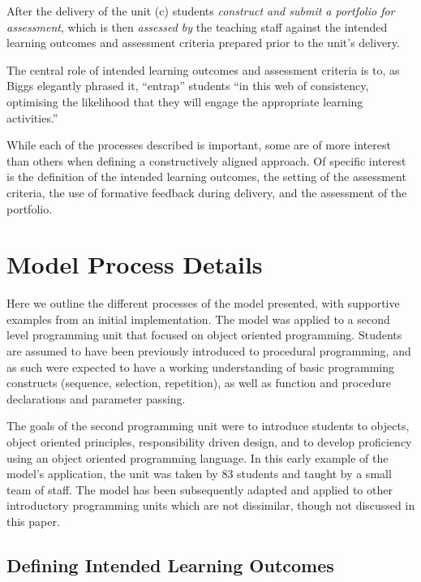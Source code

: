 After the delivery of the unit (c) students \emph{construct and submit a portfolio for assessment}, which is then \emph{assessed by} the teaching staff against the intended learning outcomes and assessment criteria prepared prior to the unit's delivery.

The central role of intended learning outcomes and assessment criteria is to, as Biggs elegantly phrased it, ``entrap'' students ``in this web of consistency, optimising the likelihood that they will engage the appropriate learning activities.''~\cite{Biggs:1999}

While each of the processes described is important, some are of more interest than others when defining a constructively aligned approach. Of specific interest is the definition of the intended learning outcomes, the setting of the assessment criteria, the use of formative feedback during delivery, and the assessment of the portfolio.

\section{Model Process Details} %
\label{sec:process_details}

Here we outline the different processes of the model presented, with supportive examples from an initial implementation. The model was applied to a second level programming unit that focused on object oriented programming. Students are assumed to have been previously introduced to procedural programming, and as such were expected to have a working understanding of basic programming constructs (sequence, selection, repetition), as well as function and procedure declarations and parameter passing. 

The goals of the second programming unit were to introduce students to objects, object oriented principles, responsibility driven design, and to develop proficiency using an object oriented programming language. In this early example of the model's application, the unit was taken by 83 students and taught by a small team of staff. The model has been subsequently adapted and applied to other introductory programming units which are not dissimilar, though not discussed in this paper.

\subsection{Defining Intended Learning Outcomes} %
\label{sub:defining_intended_learning_outcomes}

